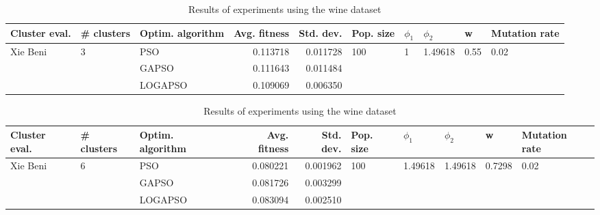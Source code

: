 \documentclass{article}
\begin{document}
\begin{table}
\centering
\caption{Results of experiments using the wine dataset}
\begin{tabular}{lllrrlllll}
\toprule
            Cluster eval. &        \# clusters & Optim. algorithm &  Avg. fitness &  Std. dev. &            Pop. size &         $\phi_{1}$ &               $\phi_{2}$ &                     w &         Mutation rate \\
\midrule
\multirow{3}{*}{Xie Beni} & \multirow{3}{*}{3} &              PSO &      0.113718 &   0.011728 & \multirow{3}{*}{100} & \multirow{3}{*}{1} & \multirow{3}{*}{1.49618} & \multirow{3}{*}{0.55} & \multirow{3}{*}{0.02} \\
                          &                    &            GAPSO &      0.111643 &   0.011484 &                      &                    &                          &                       &                       \\
                          &                    &          LOGAPSO &      0.109069 &   0.006350 &                      &                    &                          &                       &                       \\
\bottomrule
\end{tabular}
\end{table}
\begin{table}
\centering
\caption{Results of experiments using the wine dataset}
\begin{tabular}{lllrrlllll}
\toprule
            Cluster eval. &        \# clusters & Optim. algorithm &  Avg. fitness &  Std. dev. &            Pop. size &               $\phi_{1}$ &               $\phi_{2}$ &                       w &         Mutation rate \\
\midrule
\multirow{3}{*}{Xie Beni} & \multirow{3}{*}{6} &              PSO &      0.080221 &   0.001962 & \multirow{3}{*}{100} & \multirow{3}{*}{1.49618} & \multirow{3}{*}{1.49618} & \multirow{3}{*}{0.7298} & \multirow{3}{*}{0.02} \\
                          &                    &            GAPSO &      0.081726 &   0.003299 &                      &                          &                          &                         &                       \\
                          &                    &          LOGAPSO &      0.083094 &   0.002510 &                      &                          &                          &                         &                       \\
\bottomrule
\end{tabular}
\end{table}
\end{document}
